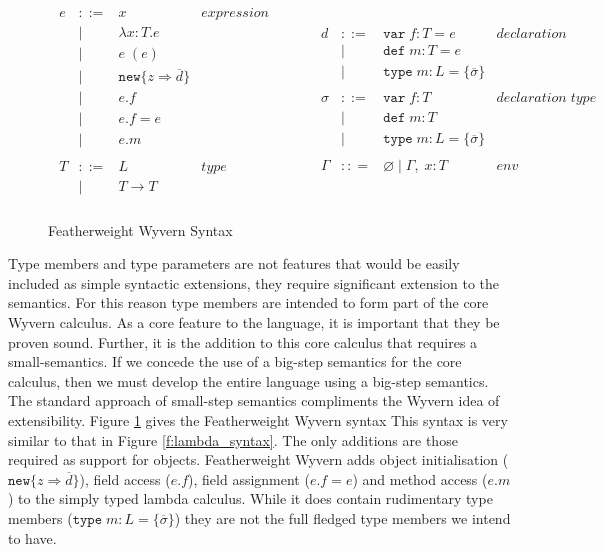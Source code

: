 \documentclass[11pt
              , a4paper
              , twoside
              , openright
              ]{report}
\numberwithin{case}{theorem}
\numberwithin{subcase}{case}
\begin{document}
\begin{figure}[t]
\[
\begin{array}{lll}
\begin{array}{lllr}
e & ::= & x & expression \\
& | & \lambda x : T. e &\\
& | & e \; (e) &\\
& | & \texttt{new} \{z \Rightarrow \overline{d}\} &\\
& | & e.f &\\
& | & e.f = e &\\
& | & e.m &\\
&&\\
T & ::= & L & type \\
& | & T \rightarrow T &\\
 \end{array}
& ~~~~~~
&
\begin{array}{lllr}
d & ::= & \texttt{var} \; f : T = e &declaration\\
& | & \texttt{def} \; m : T = e &\\
& | & \texttt{type} \; m : L = \{\overline{\sigma}\} &\\
&&\\
\sigma & ::= & \texttt{var} \; f : T &declaration \; type\\
& | & \texttt{def} \; m : T &\\
& | & \texttt{type} \; m : L = \{\overline{\sigma}\} &\\
&&\\
\Gamma & :: = & \varnothing \; | \; \Gamma,\; x : T & env \\
\end{array}
\end{array}
\]
\caption{Featherweight Wyvern Syntax}
\label{f:wyvern_syntax}
\end{figure}
Type members and type parameters are not features that would be easily included as simple syntactic extensions, they require significant extension to the semantics. For this reason type members are intended to form part of the core Wyvern calculus. As a core feature to the language, it is important that they be proven sound. Further, it is the addition to this core calculus that requires a small-semantics. If we concede the use of a big-step semantics for the core calculus, then we must develop the entire language using a big-step semantics. The standard approach of small-step semantics compliments the Wyvern idea of extensibility. Figure \ref{f:wyvern_syntax} gives the Featherweight Wyvern syntax
This syntax is very similar to that in Figure \ref{f:lambda_syntax}. The only additions are those required as support for objects. Featherweight Wyvern adds object initialisation ($\texttt{new} \{z \Rightarrow \overline{d}\}$), field access ($e.f$), field assignment ($e.f = e$) and method access ($e.m$) to the simply typed lambda calculus. While it does contain rudimentary type members ($\texttt{type} \; m : L = \{\overline{\sigma}\}$) they are not the full fledged type members we intend to have. 
\end{document}
